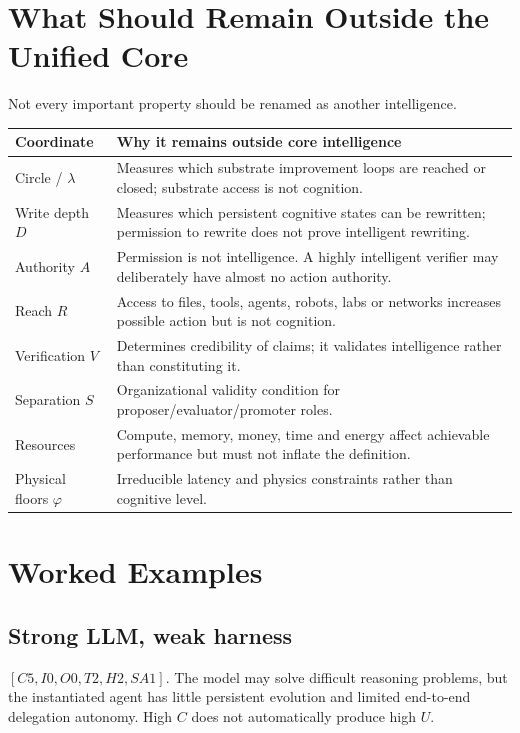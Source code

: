 \documentclass[11pt]{article}
\theoremstyle{definition}
\begin{document}
\section{What Should Remain Outside the Unified Core}

Not every important property should be renamed as another intelligence.

\begin{table}[h]
\centering\small
\begin{tabularx}{\textwidth}{@{}lY@{}}
\toprule
Coordinate & Why it remains outside core intelligence \\
\midrule
Circle / $\lambda$ & Measures which substrate improvement loops are reached or closed; substrate access is not cognition. \\
Write depth $D$ & Measures which persistent cognitive states can be rewritten; permission to rewrite does not prove intelligent rewriting. \\
Authority $A$ & Permission is not intelligence. A highly intelligent verifier may deliberately have almost no action authority. \\
Reach $R$ & Access to files, tools, agents, robots, labs or networks increases possible action but is not cognition. \\
Verification $V$ & Determines credibility of claims; it validates intelligence rather than constituting it. \\
Separation $S$ & Organizational validity condition for proposer/evaluator/promoter roles. \\
Resources & Compute, memory, money, time and energy affect achievable performance but must not inflate the definition. \\
Physical floors $\varphi$ & Irreducible latency and physics constraints rather than cognitive level. \\
\bottomrule
\end{tabularx}
\end{table}

\section{Worked Examples}

\subsection{Strong LLM, weak harness}
$[C5, I0, O0, T2, H2, SA1]$. The model may solve difficult reasoning problems, but the instantiated agent has little persistent evolution and limited end-to-end delegation autonomy. High $C$ does not automatically produce high $U$.
\end{document}
